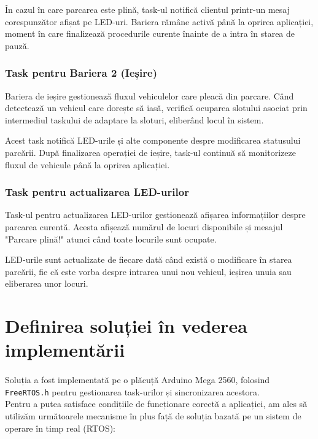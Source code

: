 \documentclass[a4paper,11pt]{report}
\begin{document}
\noindent
În cazul în care parcarea este plină, task-ul notifică clientul printr-un mesaj corespunzător afișat pe LED-uri. Bariera rămâne activă până la oprirea aplicației, moment în care finalizează procedurile curente înainte de a intra în starea de pauză.

\subsubsection{\color{black} Task pentru Bariera 2 (Ieșire)}
Bariera de ieșire gestionează fluxul vehiculelor care pleacă din parcare. Când detectează un vehicul care dorește să iasă, verifică ocuparea slotului asociat prin intermediul taskului de adaptare la sloturi, eliberând locul în sistem. \

\noindent
Acest task notifică LED-urile și alte componente despre modificarea statusului parcării. După finalizarea operației de ieșire, task-ul continuă să monitorizeze fluxul de vehicule până la oprirea aplicației.

\subsubsection{\color{black} Task pentru actualizarea LED-urilor}
Task-ul pentru actualizarea LED-urilor gestionează afișarea informațiilor despre parcarea curentă. Acesta afișează numărul de locuri disponibile și mesajul "Parcare plină!" atunci când toate locurile sunt ocupate. \

\noindent
LED-urile sunt actualizate de fiecare dată când există o modificare în starea parcării, fie că este vorba despre intrarea unui nou vehicul, ieșirea unuia sau eliberarea unor locuri. 

\section{Definirea soluției în vederea implementării}\label{sec:Mecanisme}



\paragraph{}
\color{black} 

Soluția a fost implementată pe o plăcuță Arduino Mega 2560, folosind \texttt{FreeRTOS.h} pentru gestionarea task-urilor și sincronizarea acestora. \\

\noindent
Pentru a putea satisface condițiile de funcționare corectă a aplicației, am ales să utilizăm următoarele mecanisme în plus față de soluția bazată pe un sistem de operare în timp real (RTOS):
\end{document}
